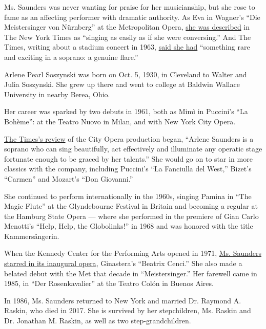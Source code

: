 Ms. Saunders was never wanting for praise for her musicianship, but she
rose to fame as an affecting performer with dramatic authority. As Eva
in Wagner's ``Die Meistersinger von Nürnberg'' at the Metropolitan
Opera,
\href{https://timesmachine.nytimes.com/timesmachine/1976/04/04/139798682.pdf?pdf_redirect=true\&ip=0}{she
was described} in The New York Times as ``singing as easily as if she
were conversing.'' And The Times, writing about a stadium concert in
1963,
\href{https://timesmachine.nytimes.com/timesmachine/1963/07/24/82081738.pdf?pdf_redirect=true\&ip=0}{said
she had} ``something rare and exciting in a soprano: a genuine flare.''

Arlene Pearl Soszynski was born on Oct. 5, 1930, in Cleveland to Walter
and Julia Soszynski. She grew up there and went to college at Baldwin
Wallace University in nearby Berea, Ohio.

Her career was sparked by two debuts in 1961, both as Mimì in Puccini's
``La Bohème'': at the Teatro Nuovo in Milan, and with New York City
Opera.

\href{https://timesmachine.nytimes.com/timesmachine/1961/10/30/119426196.pdf?pdf_redirect=true\&ip=0}{The
Times's review} of the City Opera production began, ``Arlene Saunders is
a soprano who can sing beautifully, act effectively and illuminate any
operatic stage fortunate enough to be graced by her talents.'' She would
go on to star in more classics with the company, including Puccini's
``La Fanciulla del West,'' Bizet's ``Carmen'' and Mozart's ``Don
Giovanni.''

She continued to perform internationally in the 1960s, singing Pamina in
``The Magic Flute'' at the Glyndebourne Festival in Britain and becoming
a regular at the Hamburg State Opera --- where she performed in the
premiere of Gian Carlo Menotti's ``Help, Help, the Globolinks!'' in 1968
and was honored with the title Kammersängerin.

When the Kennedy Center for the Performing Arts opened in 1971,
\href{https://timesmachine.nytimes.com/timesmachine/1971/09/19/91305513.pdf?pdf_redirect=true\&ip=0}{Ms.
Saunders starred in its inaugural opera}, Ginastera's ``Beatrix Cenci.''
She also made a belated debut with the Met that decade in
``Meistersinger.'' Her farewell came in 1985, in ``Der Rosenkavalier''
at the Teatro Colón in Buenos Aires.

In 1986, Ms. Saunders returned to New York and married Dr. Raymond A.
Raskin, who died in 2017. She is survived by her stepchildren, Ms.
Raskin and Dr. Jonathan M. Raskin, as well as two step-grandchildren.


